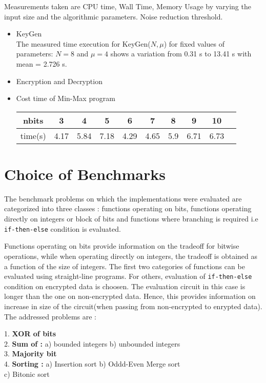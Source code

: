 \documentclass{acm_proc_article-sp}
\begin{document}
Measurements taken are CPU time, Wall Time, Memory Usage by varying the input size  and the algorithmic parameters. Noise reduction threshold.
\begin{itemize}
\item KeyGen\\
The measured time execution for KeyGen($N, \mu$)  for fixed values of parameters: $N=8$ and $\mu = 4$ shows a variation from 0.31 s to 13.41 s with mean = 2.726 s.\\
\item {Encryption and Decryption}\\


\item {Cost time of Min-Max program}\\
\begin{tabular}{|c|c|c|c|c|c|c|c|c|c|}
  \hline
  nbits  & 3 & 4 & 5 & 6 & 7 & 8 &  9  & 10 \\
  \hline
  time(s) & 4.17 & 5.84 & 7.18 & 4.29 & 4.65 & 5.9 & 6.71 & 6.73\\
  \hline
\end{tabular}
\end{itemize}
\section{Choice of Benchmarks}

The benchmark problems on which the implementations were evaluated are categorized into three classes : functions operating on bits, functions operating directly on integers or block of bits and functions where branching is required i.e \texttt{if-then-else} condition is evaluated. 

Functions operating on bits provide information on the tradeoff for bitwise operations, while when operating directly on integers, the tradeoff is obtained as a function of the size of integers. The first two categories of functions can be evaluated using straight-line programs. For others, evaluation of \texttt{if-then-else} condition on encrypted data is choosen.  The evaluation circuit in this case is longer than the one on non-encrypted data. Hence, this provides information on increase in size of the circuit(when passing from non-encrypted to enrypted data). The addressed problems are : 

1. \textbf{XOR of bits}\\
2. \textbf{Sum of :}  
\newline\noindent
\phantom{x}\hspace{3ex} a) bounded integers 
 b) unbounded integers\\ 
3. \textbf{Majority bit} \\
4. \textbf{Sorting : } \newline\noindent
\phantom{x}\hspace{3ex} a) Insertion sort b) Oddd-Even Merge sort \\
	\phantom{x}\hspace{3ex} 	    c) Bitonic sort 
\end{document}
